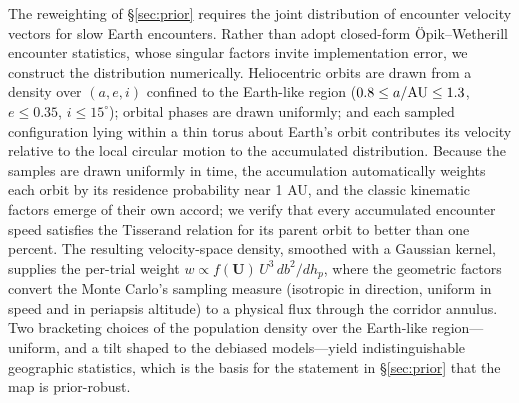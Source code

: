 \documentclass[twocolumn]{aastex701}
\begin{document}
The reweighting of \S\ref{sec:prior} requires the joint distribution of
encounter velocity vectors for slow Earth encounters. Rather than adopt
closed-form \"Opik--Wetherill encounter statistics, whose singular factors
invite implementation error, we construct the distribution numerically.
Heliocentric orbits are drawn from a density over $(a, e, i)$ confined to
the Earth-like region ($0.8 \le a/{\rm AU} \le 1.3$, $e \le 0.35$, $i \le
15^{\circ}$); orbital phases are drawn uniformly; and each sampled
configuration lying within a thin torus about Earth's orbit contributes
its velocity relative to the local circular motion to the accumulated
distribution. Because the samples are drawn uniformly in time, the
accumulation automatically weights each orbit by its residence probability
near 1 AU, and the classic kinematic factors emerge of their own accord;
we verify that every accumulated encounter speed satisfies the Tisserand
relation for its parent orbit to better than one percent. The resulting
velocity-space density, smoothed with a Gaussian kernel, supplies the
per-trial weight
$w \propto f(\mathbf{U})\,U^{3}\,db^{2}/dh_{p}$, where the geometric
factors convert the Monte Carlo's sampling measure (isotropic in
direction, uniform in speed and in periapsis altitude) to a physical flux
through the corridor annulus. Two bracketing choices of the population
density over the Earth-like region---uniform, and a tilt shaped to the
debiased models---yield indistinguishable geographic statistics, which is
the basis for the statement in \S\ref{sec:prior} that the map is
prior-robust.



\end{document}
